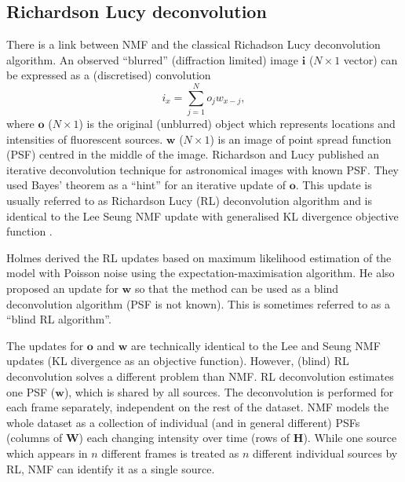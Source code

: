 
\subsection{Richardson \textendash{} Lucy deconvolution \label{sub:RL deconvolution}}
There is a link between NMF and the classical Richadson \textendash{} Lucy deconvolution algorithm. An observed ``blurred'' (diffraction limited) image $\bm{i}$ ($N\times1$ vector) can be expressed as a (discretised) convolution 
%
\begin{equation} 
	i_x=\sum_{j=1}^N o_j w_{x-j}, 
\end{equation} 
%
where $\bm{o}$ ($N\times1$) is the original (unblurred) object which represents locations and intensities of fluorescent sources. $\bm{w}$ ($N\times1$) is an image of point spread function (PSF) centred in the middle of the image. Richardson \cite{Richardson1972} and Lucy \cite{Lucy1974} published an iterative deconvolution technique for astronomical images with known PSF. They used Bayes' theorem as a ``hint'' for an iterative update of $\bm{o}$. This update is usually referred to as Richardson \textendash{} Lucy (RL) deconvolution algorithm and is identical to the Lee \textendash{} Seung NMF update with generalised KL divergence objective function \cite{Lee2001}. 

Holmes \cite{Holmes:92} derived the RL updates based on maximum likelihood estimation of the model with Poisson noise using the expectation-maximisation algorithm. He also proposed an update for $\bm{w}$ so that the method can be used as a blind deconvolution algorithm (PSF is not known). This is sometimes referred to as a ``blind RL algorithm''. 

The updates for $\bm{o}$ and $\bm{w}$ are technically identical to the Lee and Seung NMF updates (KL divergence as an objective function). However, (blind) RL deconvolution solves a different problem than NMF. RL deconvolution estimates one PSF ($\bm{w}$), which is shared by all sources. The deconvolution is performed for each frame separately, independent on the rest of the dataset. NMF models the whole dataset as a collection of individual (and in general different) PSFs (columns of $\bm{W}$) each changing intensity over time (rows of $\bm{H}$). While one source which appears in $n$ different frames is treated as $n$ different individual sources by RL, NMF can identify it as a single source. 

